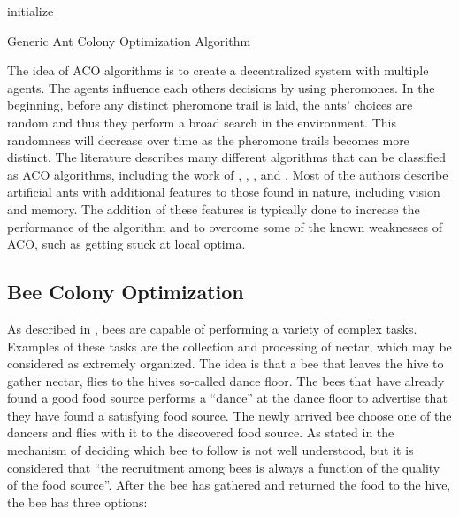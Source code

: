 \begin{algorithm}[H]
 initialize\;
 \caption{Generic Ant Colony Optimization Algorithm}
\end{algorithm}
\leavevmode \newline
The idea of ACO algorithms is to create a decentralized system with multiple agents. The agents influence each others decisions by using pheromones. In the beginning, before any distinct pheromone trail is laid, the ants' choices are random and thus they perform a broad search in the environment. This randomness will decrease over time as the pheromone trails becomes more distinct. The literature describes many different algorithms that can be classified as ACO algorithms, including the work of \citet{salehi-nezhad07}, \citet{tripathi09}, \citet{jiang10}, and \citet{dias14}. Most of the authors describe artificial ants with additional features to those found in nature, including vision and memory. The addition of these features is typically done to increase the performance of the algorithm and to overcome some of the known weaknesses of ACO, such as getting stuck at local optima.  


\subsection{Bee Colony Optimization}
As described in \citet{lucic03}, bees are capable of performing a variety of complex tasks. Examples of these tasks are the collection and processing of nectar, which may be considered as extremely organized. The idea is that a bee that leaves the hive to gather nectar, flies to the hives so-called dance floor. The bees that have already found a good food source performs a ``dance'' at the dance floor to advertise that they have found a satisfying food source. The newly arrived bee choose one of the dancers and flies with it to the discovered food source. As stated in \citet{lucic03} the mechanism of deciding which bee to follow is not well understood, but it is considered that ``the recruitment among bees is always a function of the quality of the food source''. After the bee has gathered and returned the food to the hive, the bee has three options\citep{lucic03}:

